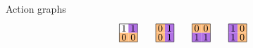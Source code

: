 \documentclass[8pt,handout]{beamer}
\begin{document}
\begin{frame}{Action graphs}
\[\begin{tikzpicture}[scale=.65]
\begin{scope}[shift={(6,0)}]
      \path[fill=actPurple] (.5,.5) rectangle ++(.5,.5);
      \path[fill=actOrange] (0,0) rectangle ++(.5,.5);
      \path[fill=actOrange] (.5,0) rectangle ++(.5,.5);
      \draw (0,0) rectangle (1,1);
      \draw (.25,.75) node{$1$}; \draw (.75,.75) node{$1$};
      \draw (.25,.25) node{$0$}; \draw (.75,.25) node{$0$};
    \end{scope}
    \begin{scope}[shift={(8,0)}]
      \path[fill=actOrange] (0,.5) rectangle ++(.5,.5); 
      \path[fill=actPurple] (.5,.5) rectangle ++(.5,.5);
      \path[fill=actOrange] (0,0) rectangle ++(.5,.5);
      \path[fill=actPurple] (.5,0) rectangle ++(.5,.5);
      \draw (0,0) rectangle (1,1);
      \draw (.25,.75) node{$0$}; \draw (.75,.75) node{$1$};
      \draw (.25,.25) node{$0$}; \draw (.75,.25) node{$1$};
    \end{scope}
    \begin{scope}[shift={(10,0)}]
      \path[fill=actOrange] (0,.5) rectangle ++(.5,.5); 
      \path[fill=actOrange] (.5,.5) rectangle ++(.5,.5);
      \path[fill=actPurple] (0,0) rectangle ++(.5,.5);
      \path[fill=actPurple] (.5,0) rectangle ++(.5,.5);
      \draw (0,0) rectangle (1,1);
      \draw (.25,.75) node{$0$}; \draw (.75,.75) node{$0$};
        \draw (.25,.25) node{$1$}; \draw (.75,.25) node{$1$};
    \end{scope}
    \begin{scope}[shift={(12,0)}]
      \path[fill=actPurple] (0,.5) rectangle ++(.5,.5); 
      \path[fill=actOrange] (.5,.5) rectangle ++(.5,.5);
      \path[fill=actPurple] (0,0) rectangle ++(.5,.5);
      \path[fill=actOrange] (.5,0) rectangle ++(.5,.5);
      \draw (0,0) rectangle (1,1);
      \draw (.25,.75) node{$1$}; \draw (.75,.75) node{$0$};
      \draw (.25,.25) node{$1$}; \draw (.75,.25) node{$0$};
    \end{scope}
  \end{tikzpicture}
  \]


\end{frame}
\end{document}
